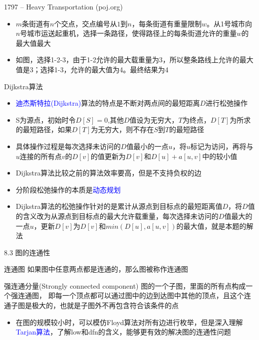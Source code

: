 \begin{frame}{1797 -- Heavy Transportation (poj.org)}
    \begin{itemize}
        \item $m$条街道有$n$个交点，交点编号从$1$到$n$，每条街道有重量限制$w$。从1号城市向$n$号城市运送起重机，选择一条路径，使得路径上的每条街道允许的重量$w$的最大值最大
        \item 如图，选择1-2-3，由于1-2允许的最大载重量为3，所以整条路线上允许的最大值是3；选择1-3，允许的最大值为4。最终结果为4
    \end{itemize}
    \begin{center}
    \end{center}
\end{frame}
\begin{frame}{Dijkstra算法}
    \begin{itemize}
        \item \textcolor{blue}{迪杰斯特拉(Dijkstra)}算法的特点是不断对两点间的最短距离$D$进行松弛操作
        \item S为源点，初始时令$D[S]=0$,其他$D$值设为无穷大，$T$为终点，$D[T]$为所求的最短路径，如果$D[T]$为无穷大，则不存在$S$到$T$的最短路径
        \item 具体操作过程是每次选择未访问的$D$值最小的一点$u$，将$u$标记为访问，再将与$u$连接的所有点$v$的$D[v]$的值更新为$D[v]$和$D[u]+a[u,v]$中的较小值
        \item Dijkstra算法比较之前的算法效率要高，但是不支持负权的边
        \item 分阶段松弛操作的本质是\textcolor{blue}{动态规划}
        \item Dijkstra算法的松弛操作针对的是累计从源点到目标点的最短距离值$D$，将$D$值的含义改为从源点到目标点的最大允许载重量，每次选择未访问的$D$值最大的一点$u$，更新$D[v]$为$D[v]$和$min(D[u],a[u,v])$的最大值，就是本题的解法
    \end{itemize}
\end{frame}
\begin{frame}{8.3 图的连通性}
    \begin{block}{连通图}
        如果图中任意两点都是连通的，那么图被称作连通图
    \end{block}
    \vfill
    \begin{block}{强连通分量(Strongly connected component)}
        图的一个子图，里面的所有点构成一个强连通图， 即每一个顶点都可以通过图中的边到达图中其他的顶点，且这个连通子图是极大的，也就是子图外不再包含符合该条件的点
    \end{block}
    \vfill
    \begin{itemize}
        \item 在图的规模较小时，可以模仿Floyd算法对所有边进行枚举，但是深入理解\textcolor{blue}{Tarjan算法}，了解low和dfn的含义，能够更有效的解决图的连通性问题
    \end{itemize}
\end{frame}

